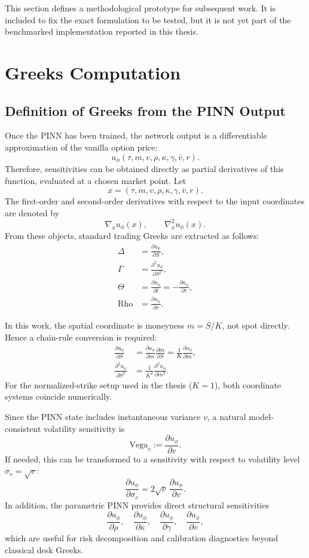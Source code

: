 This section defines a methodological prototype for subsequent work. It is included to fix the exact formulation to be tested, but it is not yet part of the benchmarked implementation reported in this thesis.

\section{Greeks Computation}

\subsection{Definition of Greeks from the PINN Output}

Once the PINN has been trained, the network output is a differentiable approximation of the vanilla option price:
\[
u_\phi(\tau,m,v,\rho,\kappa,\gamma,\bar v,r).
\]
Therefore, sensitivities can be obtained directly as partial derivatives of this function, evaluated at a chosen market point. Let
\[
x=(\tau,m,v,\rho,\kappa,\gamma,\bar v,r).
\]
The first-order and second-order derivatives with respect to the input coordinates are denoted by
\[
\nabla_x u_\phi(x),\qquad \nabla_x^2 u_\phi(x).
\]
From these objects, standard trading Greeks are extracted as follows:
\begin{align}
\Delta &= \frac{\partial u_\phi}{\partial S},\\
\Gamma &= \frac{\partial^2 u_\phi}{\partial S^2},\\
\Theta &= \frac{\partial u_\phi}{\partial t}=-\frac{\partial u_\phi}{\partial \tau},\\
\text{Rho} &= \frac{\partial u_\phi}{\partial r}.
\end{align}

In this work, the spatial coordinate is moneyness \(m=S/K\), not spot directly. Hence a chain-rule conversion is required:
\begin{align}
\frac{\partial u_\phi}{\partial S} &= \frac{\partial u_\phi}{\partial m}\frac{\partial m}{\partial S}
=\frac{1}{K}\frac{\partial u_\phi}{\partial m},\\
\frac{\partial^2 u_\phi}{\partial S^2} &= \frac{1}{K^2}\frac{\partial^2 u_\phi}{\partial m^2}.
\end{align}
For the normalized-strike setup used in the thesis (\(K=1\)), both coordinate systems coincide numerically.

Since the PINN state includes instantaneous variance \(v\), a natural model-consistent volatility sensitivity is
\[
\text{Vega}_{v}:=\frac{\partial u_\phi}{\partial v}.
\]
If needed, this can be transformed to a sensitivity with respect to volatility level \(\sigma_v=\sqrt{v}\):
\[
\frac{\partial u_\phi}{\partial \sigma_v}=2\sqrt{v}\,\frac{\partial u_\phi}{\partial v}.
\]
In addition, the parametric PINN provides direct structural sensitivities
\[
\frac{\partial u_\phi}{\partial \rho},\quad
\frac{\partial u_\phi}{\partial \kappa},\quad
\frac{\partial u_\phi}{\partial \gamma},\quad
\frac{\partial u_\phi}{\partial \bar v},
\]
which are useful for risk decomposition and calibration diagnostics beyond classical desk Greeks.

